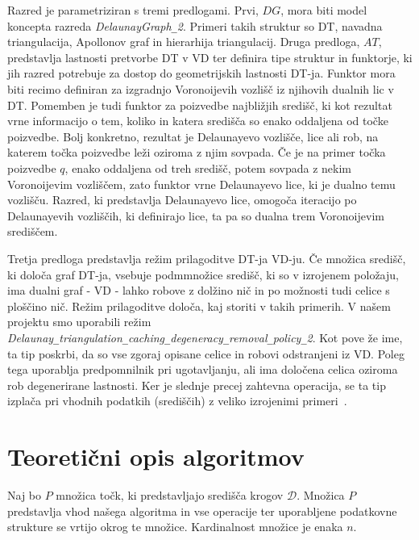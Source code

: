 \documentclass[a4paper, 12pt]{book}
\newcommand{\D}{\ensuremath{\mathcal{D}}}
\newcommand{\U}{\texttt{\_}}
\begin{document}
Razred je parametriziran s tremi predlogami. Prvi, $DG$, mora biti model koncepta razreda \textit{DelaunayGraph\U 2}. Primeri takih struktur so DT, navadna triangulacija, Apollonov graf in hierarhija triangulacij. Druga predloga, $AT$, predstavlja lastnosti pretvorbe DT v VD ter definira tipe struktur in funktorje, ki jih razred potrebuje za dostop do geometrijskih lastnosti DT-ja. Funktor mora biti recimo definiran za izgradnjo Voronoijevih vozlišč iz njihovih dualnih lic v DT. Pomemben je tudi funktor za poizvedbe najbližjih središč, ki kot rezultat vrne informacijo o tem, koliko in katera središča so enako oddaljena od točke poizvedbe. Bolj konkretno, rezultat je Delaunayevo vozlišče, lice ali rob, na katerem točka poizvedbe leži oziroma z njim sovpada. Če je na primer točka poizvedbe $q$, enako oddaljena od treh središč, potem sovpada z nekim Voronoijevim vozliščem, zato funktor vrne Delaunayevo lice, ki je dualno temu vozlišču. Razred, ki predstavlja Delaunayevo lice, omogoča iteracijo po Delaunayevih vozliščih, ki definirajo lice, ta pa so dualna trem Voronoijevim središčem.

Tretja predloga predstavlja režim prilagoditve DT-ja VD-ju. 
Če množica središč, ki določa graf DT-ja, vsebuje podmmnožice središč, ki so v izrojenem položaju, ima dualni graf - VD - lahko robove z dolžino nič in po možnosti tudi celice s ploščino nič. Režim prilagoditve določa, kaj storiti v takih primerih. V našem projektu smo uporabili režim \textit{Delaunay\U triangulation\U ca\-ching\U de\-ge\-ne\-ra\-cy\U re\-mo\-val\U po\-licy\U 2}. Kot pove že ime, ta tip poskrbi, da so vse zgoraj opisane celice in robovi odstranjeni iz VD. Poleg tega uporablja predpomnilnik pri ugotavljanju, ali ima določena celica oziroma rob degenerirane lastnosti. Ker je slednje precej zahtevna operacija, se ta tip izplača pri vhodnih podatkih (središčih) z veliko izrojenimi primeri~\cite{cgal:k-vda2-15a}.






\chapter{Teoretični opis algoritmov}
Naj bo $P$ množica točk, ki predstavljajo središča krogov $\D$. Množica $P$ predstavlja vhod našega algoritma in vse operacije ter uporabljene podatkovne strukture se vrtijo okrog te množice. Kardinalnost množice je enaka $n$.
\end{document}
